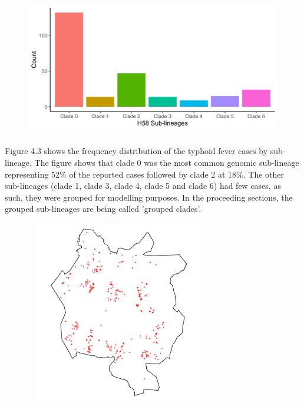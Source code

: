 \documentclass[12pt,a4paper]{report}
\begin{document}
\begin{figure}[H]
\begin{center}
\includegraphics[width = \linewidth, height = 60mm]{Sub-lineage.png}
\end{center}
\end{figure}

Figure 4.3 shows the frequency distribution of the typhoid fever cases by sub-lineage. The figure shows that clade 0 was the most common genomic sub-lineage representing 52\% of the reported cases followed by clade 2 at 18\%. The other sub-lineages (clade 1, clade 3, clade 4, clade 5 and clade 6) had few cases, as such, they were grouped for modelling purposes. In the proceeding sections, the grouped sub-lineages are being called 'grouped clades'.

\begin{figure}[H]
\begin{center}
\includegraphics[width=80mm, height = 80mm]{Spatial distribution of typhoid fever in Blantyre city.png}
\end{center}
\end{figure}
\end{document}
